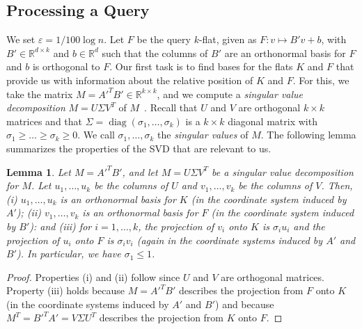 \documentclass[a4paper,11pt]{paper}
\newcommand{\mathset}[1]{\ensuremath {\mathbb {#1}}}
\newcommand{\eps}{\varepsilon}
\newcommand{\R}{\mathset{R}}
\DeclareMathOperator{\diag}{\text{diag}}
\newtheorem{lemma}[theorem]{Lemma}
\begin{document}
\subsection{Processing a Query}

We set $\eps = 1/100 \log n$.
Let $F$ be the query $k$-flat, given as $F: v \mapsto B'v + b$,
with $B' \in \R^{d \times k}$ and $b \in \R^d$ such
that the columns of $B'$ are an orthonormal basis for $F$
and $b$ is orthogonal to $F$. Our first task is to find bases
for the flats $K$ and $F$ that provide us
with information about the relative position of $K$ and $F$.
For this, we take the matrix
$M = A'^T B' \in \R^{k \times k}$, and we compute a \emph{singular
value decomposition} $M = U \Sigma V^T$ of $M$~\cite[Chapter~7.3]{HornJo13}.
Recall that $U$ and $V$ are orthogonal $k \times k$ matrices and
that $\Sigma = \diag(\sigma_1, \dots, \sigma_k)$
is a $k \times k$ diagonal matrix
with $\sigma_1 \geq \dots \geq \sigma_{k} \geq 0$.
We call $\sigma_1, \dots, \sigma_k$ the \emph{singular values}
of $M$. The following lemma summarizes the properties of
the SVD that are relevant to us.
\begin{lemma}\label{lem:svd}
  Let $M = A'^TB'$, and let $M = U \Sigma V^T$ be a singular
  value decomposition for $M$. Let $u_1, \dots, u_k$ be
  the columns of $U$ and $v_1, \dots, v_k$ be the columns of $V$.
  Then,
  (i) $u_1, \dots, u_k$ is an orthonormal basis
  for $K$ (in the coordinate system induced by $A'$);
  (ii) $v_1, \dots, v_k$ is an orthonormal basis for $F$
  (in the coordinate system induced by $B'$): and
  (iii) for $i = 1, \dots, k$, the projection of $v_i$ onto
  $K$ is $\sigma_iu_i$ and the projection of $u_i$ onto
  $F$ is $\sigma_iv_i$ (again in the coordinate systems
  induced by $A'$ and $B'$).
  In particular, we have $\sigma_1 \leq 1$.
\end{lemma}
\begin{proof}
  Properties (i) and (ii) follow since $U$ and $V$
  are orthogonal matrices.
  Property (iii) holds because $M = A'^TB'$ describes the projection
  from $F$ onto $K$ (in the coordinate systems induced by $A'$ and
  $B'$) and because $M^T = B'^TA' = V\Sigma U^T$ describes the
  projection from $K$ onto $F$.
\end{proof}
\end{document}
